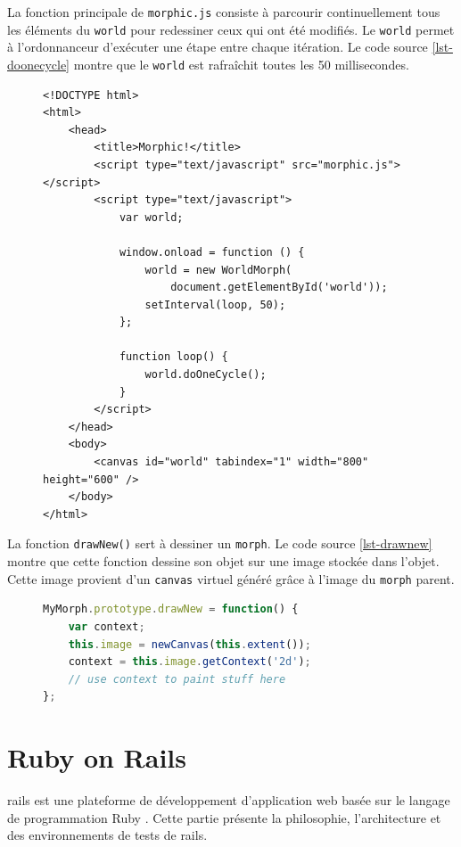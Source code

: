 La fonction principale de \texttt{morphic.js} consiste à parcourir continuellement tous les éléments du \texttt{world} pour redessiner ceux qui ont été modifiés. Le \texttt{world} permet à l'ordonnanceur d'exécuter une étape entre chaque itération. Le code source \ref{lst-doonecycle} montre que le \texttt{world} est rafraîchit toutes les 50 millisecondes.
\begin{figure}
\begin{lstlisting}[caption={Exemple d'utilisation de \texttt{morphic.js}},label=lst-doonecycle,language=HTML5,alsolanguage=JavaScript]
<!DOCTYPE html>
<html>
    <head>
        <title>Morphic!</title>
        <script type="text/javascript" src="morphic.js"></script>
        <script type="text/javascript">
            var world;

            window.onload = function () {
                world = new WorldMorph(
                    document.getElementById('world'));
                setInterval(loop, 50);
            };

            function loop() {
                world.doOneCycle();
            }
        </script>
    </head>
    <body>
        <canvas id="world" tabindex="1" width="800" height="600" />
    </body>
</html>
\end{lstlisting}
\end{figure}
La fonction \texttt{drawNew()} sert à dessiner un \texttt{morph}. Le code source \ref{lst-drawnew} montre que cette fonction dessine son objet sur une image stockée dans l'objet. Cette image provient d'un \texttt{canvas} virtuel généré grâce à l'image du \texttt{morph} parent.

\begin{figure}
\begin{lstlisting}[caption={Modèle pour la fonction \texttt{drawNew()}},label=lst-drawnew,language=JavaScript]
MyMorph.prototype.drawNew = function() {
    var context;
    this.image = newCanvas(this.extent());
    context = this.image.getContext('2d');
    // use context to paint stuff here
};
\end{lstlisting}
\end{figure}

\section{Ruby on Rails}
\label{rails}
\gls{rails} \cite{rails} est une plateforme de développement d'application web basée sur le langage de programmation Ruby \cite{ruby}. Cette partie présente la philosophie, l'architecture et des environnements de tests de \gls{rails}.

